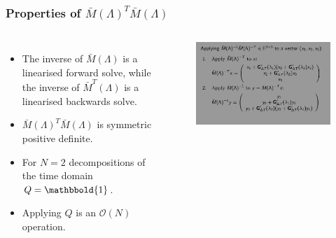 \documentclass[9pt]{beamer}
\begin{document}
\begin{frame}
\frametitle{Properties of $\bar M(\Lambda)^T\bar M(\Lambda)$}
\begin{columns}
\begin{itemize}
\item{The inverse of $\bar M(\Lambda)$ is a linearised forward solve, while the inverse of $\bar M^T(\Lambda)$ is a linearised backwards solve.}
\item{$\bar M(\Lambda)^T\bar M(\Lambda)$ is symmetric positive definite.}
\item{For $N=2$ decompositions of the time domain $Q=\mathbbold{1}$.}
\item{Applying $Q$ is an $\mathcal{O}(N)$ operation.}
\end{itemize}
\centering
\begin{figure}[!h]
\centering
\includegraphics[scale=0.2]{apply.png}

\end{figure}

\end{columns}
\end{frame}

\end{document}
